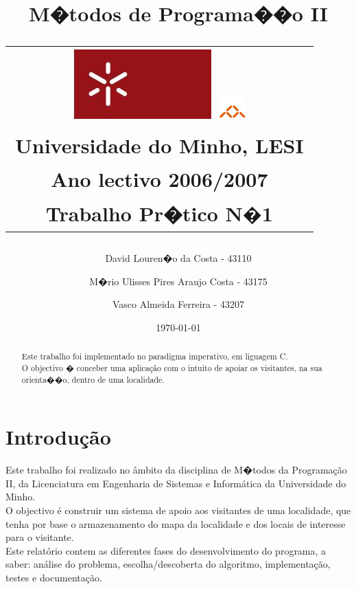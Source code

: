\documentclass[11pt,a4paper]{article}
\title{\sf  M�todos de Programa��o II \\
\begin{tabular}{c}
	\includegraphics[width=.1\textwidth]{stuff/uminho.jpg}
	\includegraphics[width=.07\textwidth]{stuff/informatica.jpg}\\
	{\small Universidade do Minho}, {\small LESI}\\
	{\small Ano lectivo 2006/2007}\\
	{\small Trabalho Pr�tico N$�$1}\\
\end{tabular}
}
\author{
	{\small David Louren�o da Costa - 43110} \and
	{\small M�rio Ulisses Pires Araujo Costa - 43175} \and
	{\small Vasco Almeida Ferreira - 43207}}
\date{{\small \today}}
\begin{document}
\maketitle

\begin{abstract}
Este trabalho foi implementado no paradigma imperativo, em liguagem C.\\
O objectivo � conceber uma aplica\c c\~ao com o intuito de apoiar os visitantes, na sua orienta��o, dentro de uma localidade.\\
\end{abstract}

\pagebreak
\dosecttoc
\dosectlof
\doparttoc
\dopartlof
\tableofcontents
\listoffigures
\pagebreak

\section{Introdu\c c\~ao}
\addtocounter{stc}{0} %
Este trabalho foi realizado no \^ambito da disciplina de M�todos da Programa\c c\~ ao II, da Licenciatura em Engenharia de Sistemas e Inform\'atica da Universidade do Minho.\\
O objectivo \'e construir um sistema de apoio aos visitantes de uma localidade, que tenha por base o armazenamento do mapa da localidade
e dos locais de interesse para o visitante.\\

Este relat\'orio contem as diferentes fases do desenvolvimento do programa, a saber: an\'alise do problema, escolha/descoberta do
algoritmo, implementa\c c\~ao, testes e documenta\c c\~ao.
\end{document}
